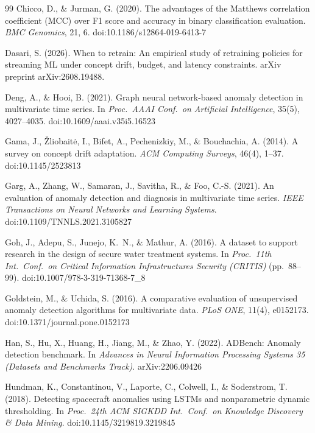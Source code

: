 \documentclass[11pt]{article}
\begin{document}
\begin{thebibliography}{99}
 Chicco, D., \& Jurman, G. (2020). The advantages of the Matthews correlation coefficient (MCC) over F1 score and accuracy in binary classification evaluation. \emph{BMC Genomics}, 21, 6. doi:10.1186/s12864-019-6413-7

 Dasari, S. (2026). When to retrain: An empirical study of retraining policies for streaming ML under concept drift, budget, and latency constraints. arXiv preprint arXiv:2608.19488.

 Deng, A., \& Hooi, B. (2021). Graph neural network-based anomaly detection in multivariate time series. In \emph{Proc.\ AAAI Conf.\ on Artificial Intelligence}, 35(5), 4027--4035. doi:10.1609/aaai.v35i5.16523

 Gama, J., \v{Z}liobait\.{e}, I., Bifet, A., Pechenizkiy, M., \& Bouchachia, A. (2014). A survey on concept drift adaptation. \emph{ACM Computing Surveys}, 46(4), 1--37. doi:10.1145/2523813

 Garg, A., Zhang, W., Samaran, J., Savitha, R., \& Foo, C.-S. (2021). An evaluation of anomaly detection and diagnosis in multivariate time series. \emph{IEEE Transactions on Neural Networks and Learning Systems}. doi:10.1109/TNNLS.2021.3105827

 Goh, J., Adepu, S., Junejo, K.~N., \& Mathur, A. (2016). A dataset to support research in the design of secure water treatment systems. In \emph{Proc.\ 11th Int.\ Conf.\ on Critical Information Infrastructures Security (CRITIS)} (pp.\ 88--99). doi:10.1007/978-3-319-71368-7\_8

 Goldstein, M., \& Uchida, S. (2016). A comparative evaluation of unsupervised anomaly detection algorithms for multivariate data. \emph{PLoS ONE}, 11(4), e0152173. doi:10.1371/journal.pone.0152173

 Han, S., Hu, X., Huang, H., Jiang, M., \& Zhao, Y. (2022). ADBench: Anomaly detection benchmark. In \emph{Advances in Neural Information Processing Systems 35 (Datasets and Benchmarks Track)}. arXiv:2206.09426

 Hundman, K., Constantinou, V., Laporte, C., Colwell, I., \& Soderstrom, T. (2018). Detecting spacecraft anomalies using LSTMs and nonparametric dynamic thresholding. In \emph{Proc.\ 24th ACM SIGKDD Int.\ Conf.\ on Knowledge Discovery \& Data Mining}. doi:10.1145/3219819.3219845


\end{thebibliography}
\end{document}
